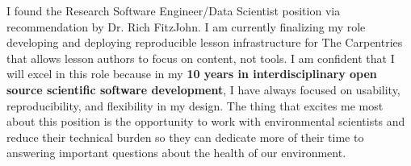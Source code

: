 


\vspace{1ex}

I found the Research Software Engineer/Data Scientist position via
recommendation by Dr. Rich FitzJohn. 
I am currently finalizing my role developing and deploying reproducible lesson
infrastructure for The Carpentries that allows lesson authors to focus on
content, not tools.
I am confident that I will excel in this role because in my \textbf{10 years in
interdisciplinary open source scientific software development}, I have always
focused on usability, reproducibility, and flexibility in my design.
The thing that excites me most about this position is the opportunity to work
with environmental scientists and reduce their technical burden so they can
dedicate more of their time to answering important questions about the health
of our environment.

